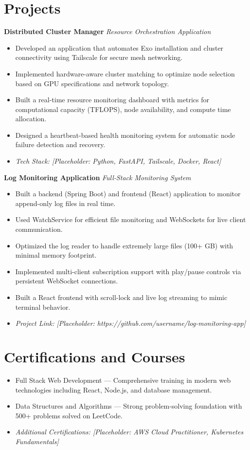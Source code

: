 \documentclass[11pt,a4paper]{article}
\begin{document}
\section*{Projects}
\textbf{Distributed Cluster Manager} \hfill \textit{Resource Orchestration Application}
\begin{itemize}
    \item Developed an application that automates Exo installation and cluster connectivity using Tailscale for secure mesh networking.
    \item Implemented hardware-aware cluster matching to optimize node selection based on GPU specifications and network topology.
    \item Built a real-time resource monitoring dashboard with metrics for computational capacity (TFLOPS), node availability, and compute time allocation.
    \item Designed a heartbeat-based health monitoring system for automatic node failure detection and recovery.
    \item \textit{Tech Stack: [Placeholder: Python, FastAPI, Tailscale, Docker, React]}
\end{itemize}

\textbf{Log Monitoring Application} \hfill \textit{Full-Stack Monitoring System}
\begin{itemize}
    \item Built a backend (Spring Boot) and frontend (React) application to monitor append-only log files in real time.
    \item Used WatchService for efficient file monitoring and WebSockets for live client communication.
    \item Optimized the log reader to handle extremely large files (100+ GB) with minimal memory footprint.
    \item Implemented multi-client subscription support with play/pause controls via persistent WebSocket connections.
    \item Built a React frontend with scroll-lock and live log streaming to mimic terminal behavior.
    \item \textit{Project Link: [Placeholder: https://github.com/username/log-monitoring-app]}
\end{itemize}

\section*{Certifications and Courses}
\begin{itemize}
    \item Full Stack Web Development --- Comprehensive training in modern web technologies including React, Node.js, and database management.
    \item Data Structures and Algorithms --- Strong problem-solving foundation with 500+ problems solved on LeetCode.
    \item \textit{Additional Certifications: [Placeholder: AWS Cloud Practitioner, Kubernetes Fundamentals]}
\end{itemize}
\end{document}
